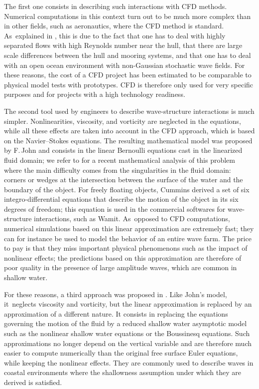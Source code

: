 \documentclass[JEP,XML,SOM,Unicode,NoFloatCountersInSection,published]{cedram}
\theoremstyle{definition}
\begin{document}
The first one consists in describing such interactions with CFD methods.
Numerical computations in this context turn out to be much more complex than in other fields, such as aeronautics, where the CFD method is standard. As~explained in \cite{Kim}, this is due to the fact that one has to deal with highly separated flows with high Reynolds number near the hull,
that there are large scale differences between the hull and mooring systems,
and that one has to deal with an open ocean environment with non-Gaussian stochastic wave fields.
For these reasons, the cost of a CFD project has been estimated to be comparable to physical model tests with prototypes.
CFD is therefore only used for very specific purposes and for projects with a high technology readiness.

The second tool used by engineers to describe wave-structure interactions is much simpler.
Nonlinearities, viscosity, and vorticity are neglected in the equations,
while all these effects are taken into account in the CFD approach, which is based on the Navier--Stokes equations.
The resulting mathematical model was proposed by F.\,John \cite{John1,John2} and consists in the linear Bernoulli equations cast in the linearized fluid domain;
we refer to \cite{LannesMing} for a recent mathematical analysis of this problem where the main difficulty comes from the singularities in the fluid domain:
corners or wedges at the intersection between the surface of the water and the boundary of the object.
For freely floating objects, Cummins \cite{Cummins} derived a set of six integro-differential equations
that describe the motion of the object in its six degrees of freedom;
this equation is used in the commercial softwares for wave-structure interactions, such as Wamit. As~opposed to CFD computations, numerical simulations based on this linear approximation are extremely fast;
they can for instance be used to model the behavior of an entire wave farm.
The price to pay is that they miss important physical phenomenons such as the impact of nonlinear effects;
the predictions based on this approximation are therefore of poor quality in the presence of large amplitude waves, which are common in shallow water.

For these reasons, a third approach was proposed in \cite{Lannes2017}.
Like John's model, it~\hbox{neglects} viscosity and vorticity, but the linear approximation is replaced by an approximation of a different nature.
It consists in replacing the equations governing the motion of the fluid by a reduced shallow water asymptotic model
such as the nonlinear shallow water equations or the Boussinesq equations.
Such approximations no longer depend on the vertical variable and are therefore much easier to compute numerically than the original free surface Euler equations,
while keeping the nonlinear effects.
They are commonly used to describe waves in coastal environments where the shallowness assumption under which they are derived is satisfied.
\end{document}
